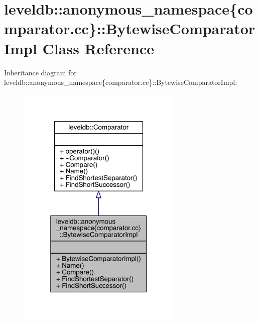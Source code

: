 \hypertarget{classleveldb_1_1anonymous__namespace_02comparator_8cc_03_1_1_bytewise_comparator_impl}{}\section{leveldb\+:\+:anonymous\+\_\+namespace\{comparator.\+cc\}\+:\+:Bytewise\+Comparator\+Impl Class Reference}
\label{classleveldb_1_1anonymous__namespace_02comparator_8cc_03_1_1_bytewise_comparator_impl}


Inheritance diagram for leveldb\+:\+:anonymous\+\_\+namespace\{comparator.\+cc\}\+:\+:Bytewise\+Comparator\+Impl\+:
\nopagebreak
\begin{figure}[H]
\begin{center}
\leavevmode
\includegraphics[width=223pt]{classleveldb_1_1anonymous__namespace_02comparator_8cc_03_1_1_bytewise_comparator_impl__inherit__graph}
\end{center}
\end{figure}


